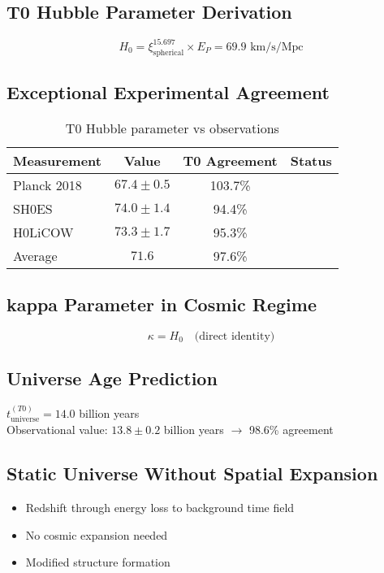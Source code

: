 \documentclass[12pt,a4paper]{report}
\begin{document}
	\subsection{T0 Hubble Parameter Derivation}
	$$H_0 = \xi_{\text{spherical}}^{15.697} \times E_P = 69.9 \text{ km/s/Mpc}$$
	
	\subsection{Exceptional Experimental Agreement}
	\begin{table}[h]
		\centering
		\begin{tabular}{lccc}
			\toprule
			\textbf{Measurement} & \textbf{Value} & \textbf{T0 Agreement} & \textbf{Status} \\
			\midrule
			Planck 2018 & $67.4 \pm 0.5$ & 103.7\% & \checkmark \\
			SH0ES & $74.0 \pm 1.4$ & 94.4\% & \checkmark \\
			H0LiCOW & $73.3 \pm 1.7$ & 95.3\% & \checkmark \\
			Average & $71.6$ & 97.6\% & \checkmark \\
			\bottomrule
		\end{tabular}
		\caption{T0 Hubble parameter vs observations}
		\label{tab:hubble-comparison}
	\end{table}
	
	\subsection{kappa Parameter in Cosmic Regime}
	$$\kappa = H_0 \quad \text{(direct identity)}$$
	
	\subsection{Universe Age Prediction}
	$t_{\text{universe}}^{(T0)} = 14.0$ billion years\\
	Observational value: $13.8 \pm 0.2$ billion years $\rightarrow$ 98.6\% agreement
	
	\subsection{Static Universe Without Spatial Expansion}
	\begin{itemize}
		\item Redshift through energy loss to background time field
		\item No cosmic expansion needed
		\item Modified structure formation
	\end{itemize}
	
\end{document}
